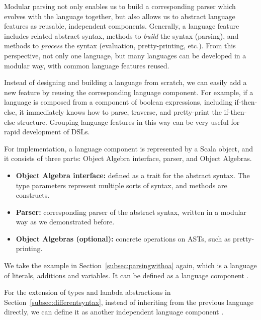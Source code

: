Modular parsing not only enables us to build a corresponding parser
which evolves with the language together, but also allows us to
abstract language features as reusable, independent components.
Generally, a language feature includes related abstract syntax,
methods to \textit{build} the syntax (parsing), and methods to
\textit{process} the syntax (evaluation, pretty-printing, etc.). From
this perspective, not only one language, but many languages can be
developed in a modular way, with common language features reused.

Instead of designing and building a language from scratch, we can
easily add a new feature by reusing the corresponding language
component. For example, if a language is composed from a component of
boolean expressions, including if-then-else, it immediately knows how
to parse, traverse, and pretty-print the if-then-else structure.
Grouping language features in this way can
be very useful for rapid development of DSLs.

For implementation, a language component is represented by a Scala object, and it consists of three parts: Object Algebra interface, parser, and Object Algebras.

\begin{itemize}[leftmargin=*]
    \item \textbf{Object Algebra interface:} defined as a trait for the abstract syntax. The type parameters represent multiple sorts of syntax, and  methods are constructs.
    \item \textbf{Parser:} corresponding parser of the abstract syntax, written in a modular way as we demonstrated before.
    \item \textbf{Object Algebras (optional):} concrete operations on ASTs, such as pretty-printing.
\end{itemize}

We take the example in Section~\ref{subsec:parsingwithoa} again, which is a language of literals, additions and variables. It can be defined as a language component .


For the extension of types and lambda abstractions in Section~\ref{subsec:differentsyntax}, instead of inheriting from the previous language directly, we can define it as another independent language component .


